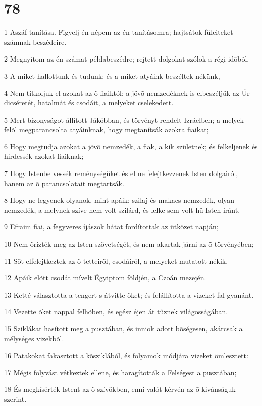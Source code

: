 \chapter{78}

\par 1 Aszáf tanítása. Figyelj én népem az én tanításomra; hajtsátok füleiteket számnak beszédeire.
\par 2 Megnyitom az én számat példabeszédre; rejtett dolgokat szólok a régi idõbõl.
\par 3 A miket hallottunk és tudunk; és a miket atyáink beszéltek nékünk,
\par 4 Nem titkoljuk el azokat az õ fiaiktól; a jövõ nemzedéknek is elbeszéljük az Úr dicséretét, hatalmát és csodáit, a melyeket cselekedett.
\par 5 Mert bizonyságot állított Jákóbban, és törvényt rendelt Izráelben; a melyek felõl megparancsolta atyáinknak, hogy megtanítsák azokra fiaikat;
\par 6 Hogy megtudja azokat a jövõ nemzedék, a fiak, a kik születnek; és felkeljenek és hirdessék azokat fiaiknak;
\par 7 Hogy Istenbe vessék reménységüket és el ne felejtkezzenek Isten dolgairól, hanem az õ parancsolatait megtartsák.
\par 8 Hogy ne legyenek olyanok, mint apáik: szilaj és makacs nemzedék, olyan nemzedék, a melynek szíve nem volt szilárd, és lelke sem volt hû Isten iránt.
\par 9 Efraim fiai, a fegyveres íjászok hátat fordítottak az ütközet napján;
\par 10 Nem õrizték meg az Isten szövetségét, és nem akartak járni az õ törvényében;
\par 11 Sõt elfelejtkeztek az õ tetteirõl, csodáiról, a melyeket mutatott nékik.
\par 12 Apáik elõtt csodát mívelt Égyiptom földjén, a Czoán mezején.
\par 13 Ketté választotta a tengert s átvitte õket; és felállította a vizeket fal gyanánt.
\par 14 Vezette õket nappal felhõben, és egész éjen át tûznek világosságában.
\par 15 Sziklákat hasított meg a pusztában, és inniok adott bõségesen, akárcsak a mélységes vizekbõl.
\par 16 Patakokat fakasztott a kõsziklából, és folyamok módjára vizeket ömlesztett:
\par 17 Mégis folyvást vétkeztek ellene, és haragították a Felségest a pusztában;
\par 18 És megkísérték Istent az õ szívökben, enni valót kérvén az õ kivánságuk szerint.
